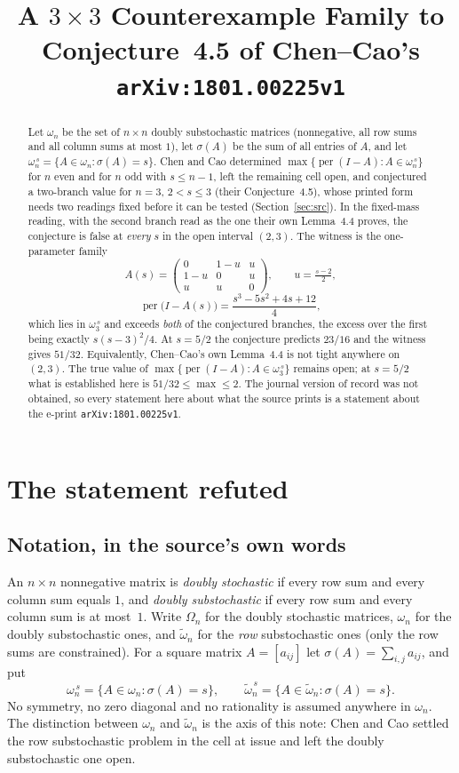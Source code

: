 \documentclass[11pt]{amsart}
\title[A counterexample family to Conjecture 4.5 of \texttt{arXiv:1801.00225v1}]
{A $3\times3$ Counterexample Family to Conjecture~4.5 of
Chen--Cao's \texttt{arXiv:1801.00225v1}}
\date{}
\theoremstyle{remark}
\DeclareMathOperator{\per}{per}
\newcommand{\ws}{\omega}
\newcommand{\wt}{\tilde{\omega}}
\begin{document}
\begin{abstract}
Let $\ws_n$ be the set of $n\times n$ doubly substochastic matrices (nonnegative,
all row sums and all column sums at most $1$), let $\sigma(A)$ be the sum of all
entries of $A$, and let $\ws_n^{\,s}=\{A\in\ws_n:\sigma(A)=s\}$. Chen and Cao
determined $\max\{\per(I-A):A\in\ws_n^{\,s}\}$ for $n$ even and for $n$ odd with
$s\le n-1$, left the remaining cell open, and conjectured a two-branch value for
$n=3$, $2<s\le 3$ (their Conjecture~4.5), whose printed form needs two readings fixed
before it can be tested (Section~\ref{sec:src}). In the fixed-mass reading, with the
second branch read as the one their own Lemma~4.4 proves, the conjecture is false at
\emph{every} $s$ in the open interval $(2,3)$. The witness is the one-parameter
family
\[
 A(s)=\begin{pmatrix}0&1-u&u\\ 1-u&0&u\\ u&u&0\end{pmatrix},
 \qquad u=\tfrac{s-2}{2},
\]
\[
 \per\bigl(I-A(s)\bigr)=\frac{s^{3}-5s^{2}+4s+12}{4},
\]
which lies in $\ws_3^{\,s}$ and exceeds \emph{both} of the conjectured branches, the
excess over the first being exactly $s(s-3)^{2}/4$. At $s=5/2$ the conjecture
predicts $23/16$ and the witness gives $51/32$. Equivalently, Chen--Cao's own
Lemma~4.4 is not tight anywhere on $(2,3)$. The true value
of $\max\{\per(I-A):A\in\ws_3^{\,s}\}$ remains open; at $s=5/2$ what is established
here is $51/32\le\max\le2$. The journal version of record was not obtained, so every
statement here about what the source prints is a statement about the e-print
\texttt{arXiv:1801.00225v1}.
\end{abstract}

\maketitle

\section{The statement refuted}\label{sec:src}

\subsection*{Notation, in the source's own words}
An $n\times n$ nonnegative matrix is \emph{doubly stochastic} if every row sum and
every column sum equals $1$, and \emph{doubly substochastic} if every row sum and
every column sum is at most~$1$. Write $\Omega_n$ for the doubly stochastic
matrices, $\ws_n$ for the doubly substochastic ones, and $\wt_n$ for the
\emph{row} substochastic ones (only the row sums are constrained). For a square
matrix $A=[a_{ij}]$ let $\sigma(A)=\sum_{i,j}a_{ij}$, and put
\[
 \ws_n^{\,s}=\{A\in\ws_n:\sigma(A)=s\},
 \qquad
 \wt_n^{\,s}=\{A\in\wt_n:\sigma(A)=s\}.
\]
No symmetry, no zero diagonal and no rationality is assumed anywhere in $\ws_n$.
The distinction between $\ws_n$ and $\wt_n$ is the axis of this note: Chen and Cao
settled the row substochastic problem in the cell at issue and left the doubly
substochastic one open.
\end{document}
